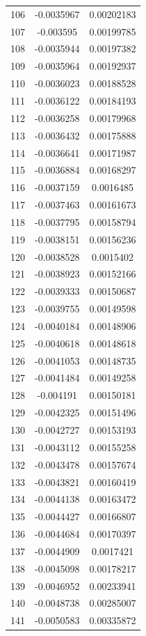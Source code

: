 \documentclass[a4paper, 11pt, oneside]{report}
\begin{document}
{\begin{longtable}{|c|c|c|}
106 & -0.0035967 & 0.00202183 \\
107 & -0.003595  & 0.00199785 \\
108 & -0.0035944 & 0.00197382 \\
109 & -0.0035964 & 0.00192937 \\
110 & -0.0036023 & 0.00188528 \\
111 & -0.0036122 & 0.00184193 \\
112 & -0.0036258 & 0.00179968 \\
113 & -0.0036432 & 0.00175888 \\
114 & -0.0036641 & 0.00171987 \\
115 & -0.0036884 & 0.00168297 \\
116 & -0.0037159 & 0.0016485  \\
117 & -0.0037463 & 0.00161673 \\
118 & -0.0037795 & 0.00158794 \\
119 & -0.0038151 & 0.00156236 \\
120 & -0.0038528 & 0.0015402  \\
121 & -0.0038923 & 0.00152166 \\
122 & -0.0039333 & 0.00150687 \\
123 & -0.0039755 & 0.00149598 \\
124 & -0.0040184 & 0.00148906 \\
125 & -0.0040618 & 0.00148618 \\
126 & -0.0041053 & 0.00148735 \\
127 & -0.0041484 & 0.00149258 \\
128 & -0.004191  & 0.00150181 \\
129 & -0.0042325 & 0.00151496 \\
130 & -0.0042727 & 0.00153193 \\
131 & -0.0043112 & 0.00155258 \\
132 & -0.0043478 & 0.00157674 \\
133 & -0.0043821 & 0.00160419 \\
134 & -0.0044138 & 0.00163472 \\
135 & -0.0044427 & 0.00166807 \\
136 & -0.0044684 & 0.00170397 \\
137 & -0.0044909 & 0.0017421  \\
138 & -0.0045098 & 0.00178217 \\
139 & -0.0046952 & 0.00233941 \\
140 & -0.0048738 & 0.00285007 \\
141 & -0.0050583 & 0.00335872 \\

\end{longtable}}
\end{document}
